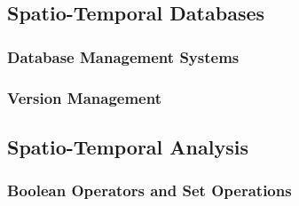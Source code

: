 





\subsection{Spatio-Temporal Databases} %
\label{sub:spatio_temporal_databases}

\subsubsection{Database Management Systems} %
\label{ssub:database_management_systems}


\subsubsection{Version Management} %
\label{ssub:version_management}





\subsection{Spatio-Temporal Analysis} %
\label{sub:spatio_temporal_analysis}

\subsubsection{Boolean Operators and Set Operations} %
\label{ssub:boolean_operators_and_set_operations}






